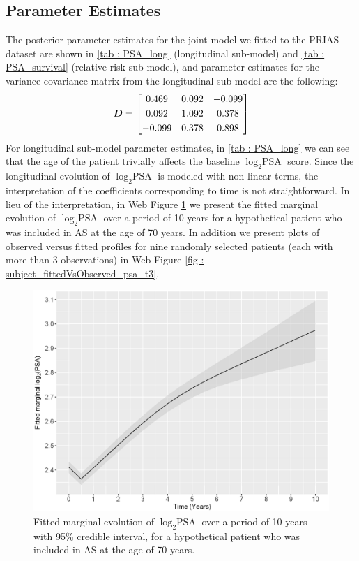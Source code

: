\subsection{Parameter Estimates}
\label{subsec : param_estimates}
The posterior parameter estimates for the joint model we fitted to the PRIAS dataset are shown in \ref{tab : PSA_long} (longitudinal sub-model) and \ref{tab : PSA_survival} (relative risk sub-model), and parameter estimates for the variance-covariance matrix from the longitudinal sub-model are the following:
\begin{equation*}
\boldsymbol{D} = \begin{bmatrix}
       0.469 & 0.092 & -0.099 \\[0.3em]
       0.092 & 1.092 & 0.378 \\[0.3em]
       -0.099 & 0.378 & 0.898
     \end{bmatrix}
\end{equation*} 
For longitudinal sub-model parameter estimates, in \ref{tab : PSA_long} we can see that the age of the patient trivially affects the baseline $\log_2 \mbox{PSA}$ score. Since the longitudinal evolution of $\log_2 \mbox{PSA}$ is modeled with non-linear terms, the interpretation of the coefficients corresponding to time is not straightforward. In lieu of the interpretation, in Web Figure \ref{fig : fitted_trend_psa} we present the fitted marginal evolution of $\log_2 \mbox{PSA}$ over a period of 10 years for a hypothetical patient who was included in AS at the age of 70 years. In addition we present plots of observed versus fitted profiles for nine randomly selected patients (each with more than 3 observations) in Web Figure \ref{fig : subject_fittedVsObserved_psa_t3}.

\begin{figure}[!htb]
\centerline{\includegraphics[width=\columnwidth]{images/model_fit/marginal_fitted_psa_t3.eps}}
\caption{Fitted marginal evolution of $\log_2 \mbox{PSA}$ over a period of 10 years with 95\% credible interval, for a hypothetical patient who was included in AS at the age of 70 years.}
\label{fig : fitted_trend_psa}
\end{figure}

